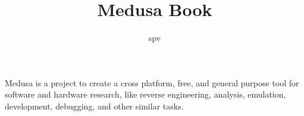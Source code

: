 \documentclass{article}
\title{Medusa Book}
\author{spv}
\begin{document}
	\maketitle

	Medusa is a project to create a cross platform, free, and general purpose
    tool for software and hardware research, like reverse engineering, analysis,
    emulation, development, debugging, and other similar tasks.
\end{document}
